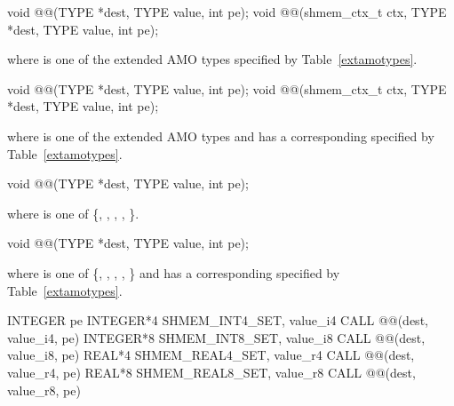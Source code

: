 
\begin{apidefinition}

\begin{C11synopsis}
void @@(TYPE *dest, TYPE value, int pe);
void @@(shmem_ctx_t ctx, TYPE *dest, TYPE value, int pe);
\end{C11synopsis}
where \TYPE{} is one of the extended \ac{AMO} types specified by
Table~\ref{extamotypes}.

\begin{Csynopsis}
void @@(TYPE *dest, TYPE value, int pe);
void @@(shmem_ctx_t ctx, TYPE *dest, TYPE value, int pe);
\end{Csynopsis}
where \TYPE{} is one of the extended \ac{AMO} types and has a corresponding
\TYPENAME{} specified by Table~\ref{extamotypes}.

\begin{DeprecateBlock}
\begin{C11synopsis}
void @@(TYPE *dest, TYPE value, int pe);
\end{C11synopsis}
where \TYPE{} is one of \{, , ,
, \}.

\begin{Csynopsis}
void @@(TYPE *dest, TYPE value, int pe);
\end{Csynopsis}
where \TYPE{} is one of \{, , ,
, \} and has a corresponding
\TYPENAME{} specified by Table~\ref{extamotypes}.
\end{DeprecateBlock}

\begin{Fsynopsis}
INTEGER pe
INTEGER*4 SHMEM_INT4_SET, value_i4
CALL @@(dest, value_i4, pe)
INTEGER*8 SHMEM_INT8_SET, value_i8
CALL @@(dest, value_i8, pe)
REAL*4 SHMEM_REAL4_SET, value_r4
CALL @@(dest, value_r4, pe)
REAL*8 SHMEM_REAL8_SET, value_r8
CALL @@(dest, value_r8, pe)
\end{Fsynopsis}

\begin{apiarguments}


\end{apiarguments}
\end{apidefinition}
